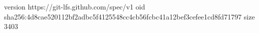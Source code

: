 version https://git-lfs.github.com/spec/v1
oid sha256:4d8cae520112bf2adbc5f4125548cc4cb56fcbc41a12bef3cefee1cd8fd71797
size 3403
